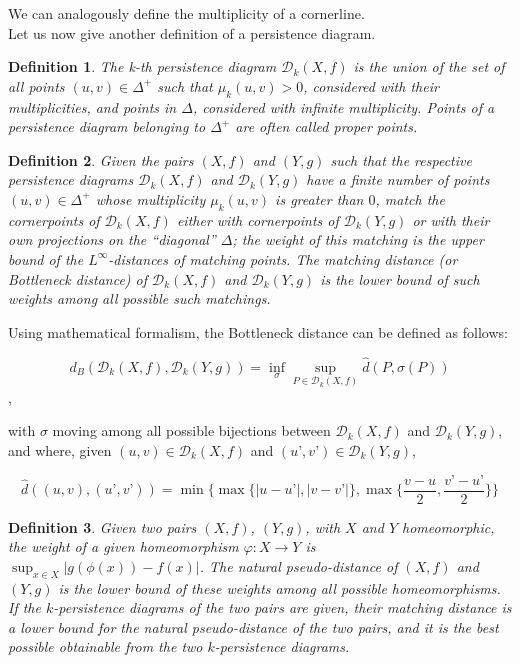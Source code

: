 \documentclass[english, LaM, oneside, noexaminfo]{sapthesis}
\newtheorem{defin}{\bf Definition}[section]
\begin{document}
\noindent We can analogously define the multiplicity of a cornerline. \\

Let us now give another definition of a persistence diagram.
\begin{defin} The \textit{k-th persistence diagram} $\mathcal{D}_k(X,f)$ is the union of the set of all points $(u,v) \in \Delta^{+}$ such that $\mu_{k}(u,v) > 0$, considered with their multiplicities, and points in $\Delta$, considered with infinite multiplicity. Points of a persistence diagram belonging to $\Delta^{+}$ are often called \textit{proper points}.  \end{defin}

\begin{defin} Given the pairs $(X,f)$ and $(Y,g)$ such that the respective persistence diagrams $\mathcal{D}_k(X,f)$ and $\mathcal{D}_k(Y,g)$ have a finite number of points $(u,v) \in \Delta^{+} $ whose multiplicity $\mu_{k}(u,v)$ is greater than $0$, match the cornerpoints of $\mathcal{D}_k(X,f)$ either with cornerpoints of $\mathcal{D}_k(Y,g)$ or with their own projections on the ``diagonal'' $\Delta$; the weight of this matching is the upper bound
of the $L^{\infty}$-distances of matching points. The \textit{matching distance} (or \textit{Bottleneck
distance}) of $\mathcal{D}_k(X,f)$ and $\mathcal{D}_k(Y,g)$ is the lower bound of such weights among all possible such matchings.   \end{defin}

Using mathematical formalism, the Bottleneck distance can be defined as follows:

$$d_B(\mathcal{D}_k(X,f),\mathcal{D}_k(Y,g)) = \inf_{\sigma} {\sup_{P \in \mathcal{D}_k(X,f)} \hat{d}(P, \sigma(P))} $$,

with $\sigma$ moving among all possible bijections between $\mathcal{D}_k(X,f)$ and $\mathcal{D}_k(Y,g)$, and where, given $(u,v) \in \mathcal{D}_k(X,f)$ and $(u’,v’) \in \mathcal{D}_k(Y,g)$, 

$$\hat{d}((u,v),(u’,v’)) = \min \biggl\{\max\{|u-u’|,|v-v’|\}, \max\biggl\{\frac{v-u}{2}, \frac{v’-u’}{2}\biggl\}\biggl\}$$

\begin{defin}  Given two pairs $(X, f)$, $(Y, g)$, with $X$ and $Y$ homeomorphic, the weight of a given homeomorphism $ \varphi: X \rightarrow Y$ is $\sup_{x \in X} {|g(\phi(x)) - f(x)|}$.
The \textit{natural pseudo-distance} of $(X, f)$ and $(Y, g)$ is the lower bound of these weights among
all possible homeomorphisms. If the $k$-persistence diagrams of the two pairs are given, their
matching distance is a lower bound for the natural pseudo-distance of the two
pairs, and it is the best possible obtainable from the two $k$-persistence diagrams.\end{defin}
\end{document}
